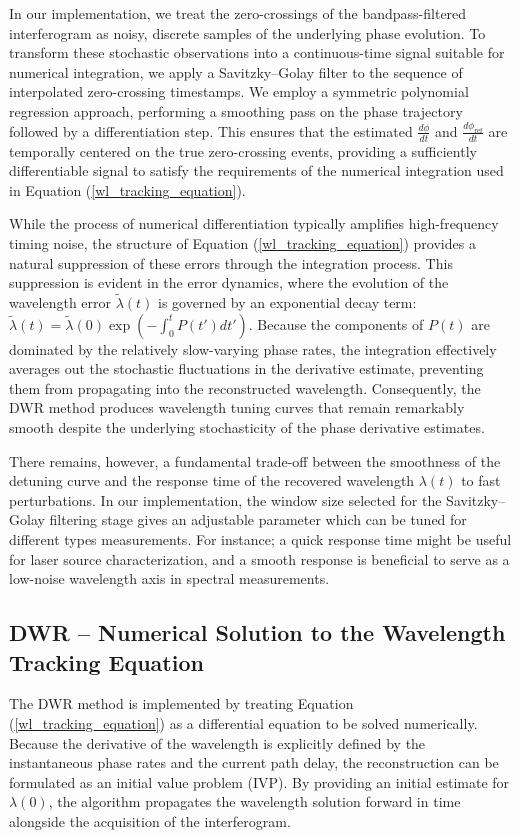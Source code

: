 \documentclass[12pt]{report}
\begin{document}
	In our implementation, we treat the zero-crossings of the bandpass-filtered interferogram as noisy, discrete samples of the underlying phase evolution. To transform these stochastic observations into a continuous-time signal suitable for numerical integration, we apply a Savitzky–Golay filter \cite{savitzky_golay_paper} to the sequence of interpolated zero-crossing timestamps. We employ a symmetric polynomial regression approach, performing a smoothing pass on the phase trajectory followed by a differentiation step. This ensures that the estimated $\frac{d\phi}{dt}$ and $\frac{d\phi_\mathrm{ref}}{dt}$ are temporally centered on the true zero-crossing events, providing a sufficiently differentiable signal to satisfy the requirements of the numerical integration used in Equation (\ref{wl_tracking_equation}).
	
	While the process of numerical differentiation typically amplifies high-frequency timing noise, the structure of Equation (\ref{wl_tracking_equation}) provides a natural suppression of these errors through the integration process. This suppression is evident in the error dynamics, where the evolution of the wavelength error $\tilde{\lambda}(t)$ is governed by an exponential decay term: $\tilde{\lambda}(t) = \tilde{\lambda}(0) \exp\left( -\int_{0}^{t} P(t') dt' \right)$. Because the components of $P(t)$ are dominated by the relatively slow-varying phase rates, the integration effectively averages out the stochastic fluctuations in the derivative estimate, preventing them from propagating into the reconstructed wavelength. Consequently, the DWR method produces wavelength tuning curves that remain remarkably smooth despite the underlying stochasticity of the phase derivative estimates.
	
	There remains, however, a fundamental trade-off between the smoothness of the detuning curve and the response time of the recovered wavelength $\lambda(t)$ to fast perturbations. In our implementation, the window size selected for the Savitzky–Golay filtering stage gives an adjustable parameter which can be tuned for different types measurements. For instance; a quick response time might be useful for laser source characterization, and a smooth response is beneficial to serve as a low-noise wavelength axis in spectral measurements. 
	
	\subsection{DWR -- Numerical Solution to the Wavelength Tracking Equation}
	The DWR method is implemented by treating Equation (\ref{wl_tracking_equation}) as a differential equation to be solved numerically. Because the derivative of the wavelength is explicitly defined by the instantaneous phase rates and the current path delay, the reconstruction can be formulated as an initial value problem (IVP). By providing an initial estimate for $\lambda(0)$, the algorithm propagates the wavelength solution forward in time alongside the acquisition of the interferogram.
		
\end{document}
